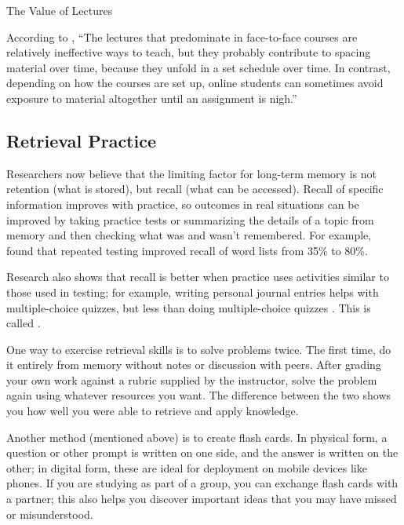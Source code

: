 \begin{aside}{The Value of Lectures}

According to \cite{Mill2016a}, ``The lectures that predominate in
face-to-face courses are relatively ineffective ways to teach, but
they probably contribute to spacing material over time, because they
unfold in a set schedule over time. In contrast, depending on how the
courses are set up, online students can sometimes avoid exposure to
material altogether until an assignment is nigh.''

\end{aside}

\subsection{Retrieval Practice}\label{retrieval-practice}

Researchers now believe that the limiting factor for long-term memory is
not retention (what is stored), but recall (what can be accessed).
Recall of specific information improves with practice, so outcomes in
real situations can be improved by taking practice tests or summarizing
the details of a topic from memory and then checking what was and wasn't
remembered. For example, \cite{Karp2008} found that repeated testing
improved recall of word lists from 35\% to 80\%.

Research also shows that recall is better when practice uses
activities similar to those used in testing; for example, writing
personal journal entries helps with multiple-choice quizzes, but less
than doing multiple-choice quizzes \cite{Mill2016a}. This is
called .

One way to exercise retrieval skills is to solve problems twice. The
first time, do it entirely from memory without notes or discussion with
peers. After grading your own work against a rubric supplied by the
instructor, solve the problem again using whatever resources you want.
The difference between the two shows you how well you were able to
retrieve and apply knowledge.

Another method (mentioned above) is to create flash cards. In physical
form, a question or other prompt is written on one side, and the answer
is written on the other; in digital form, these are ideal for deployment
on mobile devices like phones. If you are studying as part of a group,
you can exchange flash cards with a partner; this also helps you
discover important ideas that you may have missed or misunderstood.

